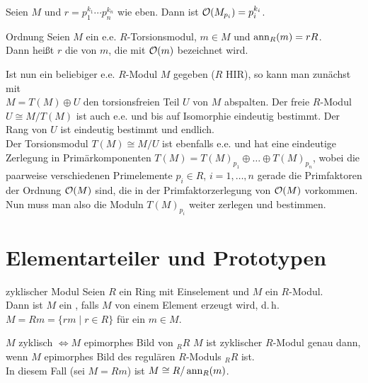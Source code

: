 \begin{Kor}
    Seien $M$ und $r = p_1^{k_1} \dotsm p_n^{k_n}$ wie eben.
    Dann ist $\mathcal{O}(M_{p_i}) = p_i^{k_i}$.
\end{Kor}

\begin{Def}{Ordnung}
    Seien $M$ ein e.e. $R$-Torsionsmodul, $m \in M$ und $\operatorname{ann}_R(m) = rR$. \\
    Dann heißt $r$ die  von $m$, die mit $\mathcal{O}(m)$
    bezeichnet wird.
\end{Def}

\begin{Bem}
    Ist nun ein beliebiger e.e. $R$-Modul $M$ gegeben ($R$ HIR), so kann
    man zunächst mit \\
    $M = T(M) \oplus U$ den torsionsfreien Teil $U$ von $M$ abspalten.
    Der freie $R$-Modul $U \cong M/T(M)$ ist auch e.e. und bis auf Isomorphie
    eindeutig bestimmt.
    Der Rang von $U$ ist eindeutig bestimmt und endlich. \\
    Der Torsionsmodul $T(M) \cong M/U$ ist ebenfalls e.e. und hat eine
    eindeutige Zerlegung in Primärkomponenten
    $T(M) = T(M)_{p_1} \oplus \dotsc \oplus T(M)_{p_n}$, wobei die paarweise
    verschiedenen Primelemente $p_i \in R$, $i = 1, \dotsc, n$ gerade die
    Primfaktoren der Ordnung $\mathcal{O}(M)$ sind, die in der
    Primfaktorzerlegung von $\mathcal{O}(M)$ vorkommen.
    Nun muss man also die Moduln $T(M)_{p_i}$ weiter zerlegen und bestimmen.
\end{Bem}

\pagebreak

\section{%
    Elementarteiler und Prototypen%
}

\begin{Def}{zyklischer Modul}
    Seien $R$ ein Ring mit Einselement und $M$ ein $R$-Modul. \\
    Dann ist $M$ ein , falls $M$ von einem
    Element erzeugt wird, d.\,h. \\
    $M = Rm = \{rm \;|\; r \in R\}$ für ein $m \in M$.
\end{Def}

\begin{Satz}{$M$ zyklisch $\Leftrightarrow M$ epimorphes Bild von ${}_R R$}
    $M$ ist zyklischer $R$-Modul genau dann, wenn $M$ epimorphes Bild des
    regulären $R$-Moduls ${}_R R$ ist. \\
    In diesem Fall (sei $M = Rm$) ist $M \cong R/\operatorname{ann}_R(m)$.
\end{Satz}

